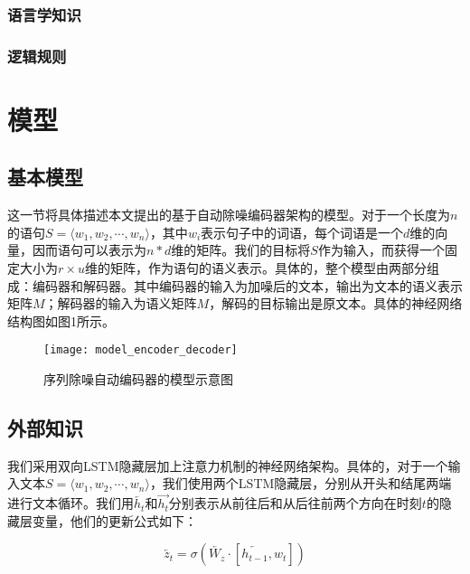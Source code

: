 \documentclass[UTF8,11pt,a4paper,nofonts]{ctexart}
\begin{document}
\subsubsection{语言学知识}

\subsubsection{逻辑规则}


\section{模型}

\subsection{基本模型}

这一节将具体描述本文提出的基于自动除噪编码器架构的模型。对于一个长度为$n$的语句$S=\langle w_1,w_2,\cdots,w_n\rangle$，其中$w_i$表示句子中的词语，每个词语是一个$d$维的向量，因而语句可以表示为$n*d$维的矩阵。我们的目标将$S$作为输入，而获得一个固定大小为$r\times u$维的矩阵，作为语句的语义表示。具体的，整个模型由两部分组成：编码器和解码器。其中编码器的输入为加噪后的文本，输出为文本的语义表示矩阵$M$；解码器的输入为语义矩阵$M$，解码的目标输出是原文本。具体的神经网络结构图如图1所示。

\begin{figure}
\centering
\texttt{[image: model\_encoder\_decoder]}
\caption{序列除噪自动编码器的模型示意图}\label{fig:01}
\end{figure} 

\subsection{外部知识}

我们采用双向LSTM隐藏层加上注意力机制的神经网络架构。具体的，对于一个输入文本$S=\langle w_1,w_2,\cdots,w_n \rangle$，我们使用两个LSTM隐藏层，分别从开头和结尾两端进行文本循环。我们用$\overleftarrow{h_t}$和$\overrightarrow{h_t}$分别表示从前往后和从后往前两个方向在时刻$t$的隐藏层变量，他们的更新公式如下：

\begin{equation}
\overleftarrow{z_t} = \sigma(\overleftarrow{W_z} \cdot [\overleftarrow{h_{t-1}},w_t])
\end{equation}
\end{document}
